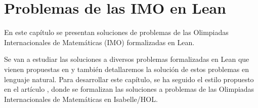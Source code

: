 \chapter{Problemas de las IMO en Lean}

En este capítulo se presentan soluciones de problemas de las Olimpiadas
Internacionales de Matemáticas (IMO) formalizadas en Lean.

Se van a estudiar las soluciones a diversos problemas formalizadas en
Lean que vienen propuestas en \cite{IM} y también detallaremos la solución
de estos problemas en lenguaje natural. Para desarrollar este capítulo,
se ha seguido el estilo propuesto en el artículo \cite{ART}, donde se
formalizan las soluciones a problemas de las Olimpiadas Internacionales
de Matemáticas en Isabelle/HOL.






